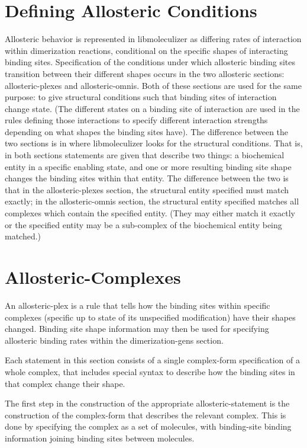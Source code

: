 \section{Defining Allosteric Conditions}
Allosteric behavior is represented in libmoleculizer as differing
rates of interaction within dimerization reactions, conditional on the
specific shapes of interacting binding sites.  Specification of the
conditions under which allosteric binding sites transition between
their different shapes occurs in the two allosteric sections:
allosteric-plexes and allosteric-omnis.  Both of these sections are used
for the same purpose: to give structural conditions such that binding
sites of interaction change state.  (The different states on a binding
site of interaction are used in the rules defining those interactions
to specify different interaction strengths depending on what shapes
the binding sites have).  The difference between the two sections is
in where libmoleculizer looks for the structural conditions.  That is,
in both sections statements are given that describe two things: a
biochemical entity in a specific enabling state, and one or more
resulting binding site shape changes the binding sites within that
entity.  The difference between the two is that in the
allosteric-plexes section, the structural entity specified must match
exactly; in the allosteric-omnis section, the structural entity
specified matches all complexes which contain the specified entity.
(They may either match it exactly or the specified entity may be a
sub-complex of the biochemical entity being matched.)

\section{Allosteric-Complexes}
An allosteric-plex is a rule that tells how the binding sites within
specific complexes (specific up to state of its unspecified
modification) have their shapes changed.  Binding site shape
information may then be used for specifying allosteric binding rates
within the dimerization-gens section.

Each statement in this section consists of a single complex-form
specification of a whole complex, that includes special syntax to
describe how the binding sites in that complex change their shape.

The first step in the construction of the appropriate
allosteric-statement is the construction of the complex-form that
describes the relevant complex.  This is done by specifying the
complex as a set of molecules, with binding-site binding information
joining binding sites between molecules.  


